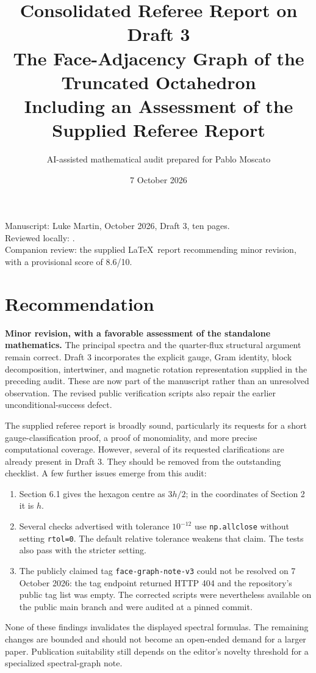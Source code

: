\documentclass[11pt,a4paper]{article}
\title{Consolidated Referee Report on Draft 3\\\large The Face-Adjacency Graph of the Truncated Octahedron\\[3pt]\normalsize Including an Assessment of the Supplied Referee Report}
\author{AI-assisted mathematical audit prepared for Pablo Moscato}
\date{7 October 2026}
\begin{document}
\maketitle
\begin{center}\small
Manuscript: Luke Martin, October 2026, Draft 3, ten pages.\\
Reviewed locally: .\\
Companion review: the supplied \LaTeX\ report recommending minor revision,\\
with a provisional score of 8.6/10.
\end{center}

\section*{Recommendation}
\textbf{Minor revision, with a favorable assessment of the standalone mathematics.} The principal spectra and the quarter-flux structural argument remain correct. Draft 3 incorporates the explicit gauge, Gram identity, block decomposition, intertwiner, and magnetic rotation representation supplied in the preceding audit. These are now part of the manuscript rather than an unresolved observation. The revised public verification scripts also repair the earlier unconditional-success defect.

The supplied referee report is broadly sound, particularly its requests for a short gauge-classification proof, a proof of monomiality, and more precise computational coverage. However, several of its requested clarifications are already present in Draft 3. They should be removed from the outstanding checklist. A few further issues emerge from this audit:
\begin{enumerate}
\item Section 6.1 gives the hexagon centre as $3h/2$; in the coordinates of Section 2 it is $h$.
\item Several checks advertised with tolerance $10^{-12}$ use \texttt{np.allclose} without setting \texttt{rtol=0}. The default relative tolerance weakens that claim. The tests also pass with the stricter setting.
\item The publicly claimed tag \texttt{face-graph-note-v3} could not be resolved on 7 October 2026: the tag endpoint returned HTTP 404 and the repository's public tag list was empty. The corrected scripts were nevertheless available on the public main branch and were audited at a pinned commit.
\end{enumerate}
None of these findings invalidates the displayed spectral formulas. The remaining changes are bounded and should not become an open-ended demand for a larger paper. Publication suitability still depends on the editor's novelty threshold for a specialized spectral-graph note.
\end{document}
